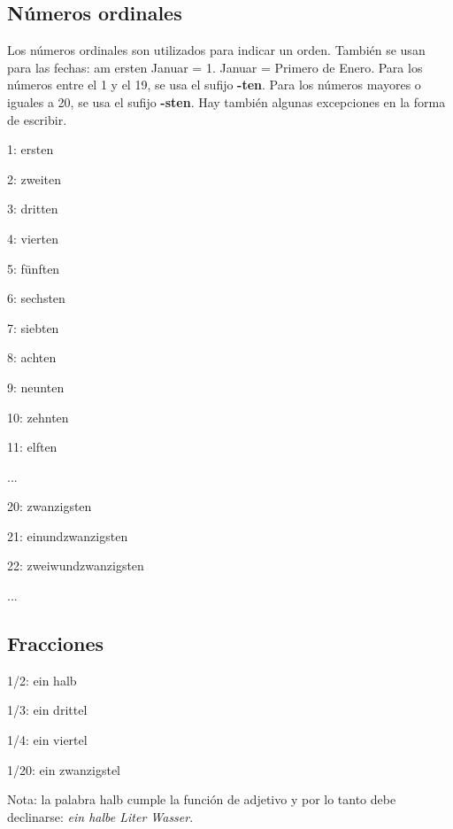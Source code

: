 \subsection{Números ordinales}
Los números ordinales son utilizados para indicar un orden. También se usan para las fechas: am ersten Januar = 1. Januar = Primero de Enero. Para los números entre el 1 y el 19, se usa el sufijo \textbf{-ten}. Para los números mayores o iguales a 20, se usa el sufijo \textbf{-sten}. Hay también algunas excepciones en la forma de escribir.
\begin{multicols}{2}
\begin{myitemize}
\item 1: ersten
\item 2: zweiten
\item 3: dritten
\item 4: vierten
\item 5: fünften
\item 6: sechsten
\item 7: siebten
\item 8: achten
\item 9: neunten
\item 10: zehnten
\item 11: elften
\item ...
\item 20: zwanzigsten
\item 21: einundzwanzigsten
\item 22: zweiwundzwanzigsten
\item ...
\end{myitemize}
\end{multicols}

\subsection{Fracciones}
\begin{multicols}{2}
\begin{myitemize}
\item 1/2: ein halb
\item 1/3: ein drittel
\item 1/4: ein viertel
\item 1/20: ein zwanzigstel
\end{myitemize}
\end{multicols}
Nota: la palabra halb cumple la función de adjetivo y por lo tanto debe declinarse: \textit{ein halbe Liter Wasser}.


